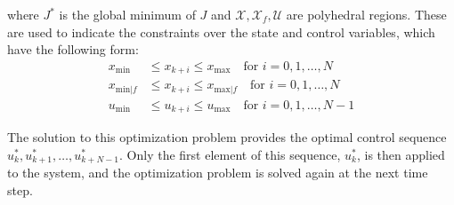 where $J^*$ is the global minimum of $J$ and $\mathcal{X}, \mathcal{X}_f,\mathcal{U}$ are polyhedral regions. These are used to indicate the constraints over the state and control variables, which have the following form:
\begin{align*}
	x_{\text{min}} &\leq x_{k+i} \leq x_{\text{max}} \quad \text{for } i = 0, 1, \ldots, N \\
	x_{\text{min}|f} &\leq x_{k+i} \leq x_{\text{max}|f} \quad \text{for } i = 0, 1, \ldots, N \\
	u_{\text{min}} &\leq u_{k+i} \leq u_{\text{max}} \quad \text{for } i = 0, 1, \ldots, N-1 
\end{align*}

The solution to this optimization problem provides the optimal control sequence $u_k^*, u_{k+1}^*, \ldots, u_{k+N-1}^*$. Only the first element of this sequence, $u_k^*$, is then applied to the system, and the optimization problem is solved again at the next time step.
